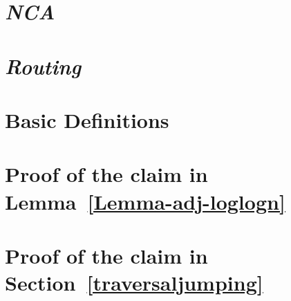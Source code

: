 \documentclass[prodmode,acmcsur]{acmsmall}
\newcommand{\NCA}{\emph{NCA}\xspace}
\newcommand{\routing}{\emph{Routing}\xspace}
\begin{document}
\section{\NCA}\label{section:NCA}
 

\section{\routing}\label{section:Routing}

%
%
 



\elecappendix

\medskip
\section{Basic Definitions}\label{AppendixA}

\section{Proof of the claim in  Lemma~\ref{Lemma-adj-loglogn}}\label{AppendixB}

\newpage
\section{Proof of the claim in  Section~\ref{traversaljumping}}\label{AppendixC}

\end{document}
